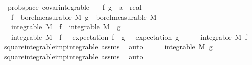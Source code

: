 \begin{isabellebody}
{\isafoldproof}%
%
\isadelimproof
\isanewline
%
\endisadelimproof
\isanewline
{}\isamarkupfalse%
\ {\isacharparenleft}{\kern0pt}\ prob{\isacharunderscore}{\kern0pt}space{\isacharparenright}{\kern0pt}\ covar{\isacharunderscore}{\kern0pt}integrable{\isacharcolon}{\kern0pt}\isanewline
\ \ \ f\ g\ {\isacharcolon}{\kern0pt}{\isacharcolon}{\kern0pt}\ {\isachardoublequoteopen}{\isacharprime}{\kern0pt}a\ {\isasymRightarrow}\ real{\isachardoublequoteclose}\isanewline
\ \ \ {\isachardoublequoteopen}f\ {\isasymin}\ borel{\isacharunderscore}{\kern0pt}measurable\ M{\isachardoublequoteclose}\ {\isachardoublequoteopen}g\ {\isasymin}\ borel{\isacharunderscore}{\kern0pt}measurable\ M{\isachardoublequoteclose}\isanewline
\ \ \ {\isachardoublequoteopen}integrable\ M\ {\isacharparenleft}{\kern0pt}{\isasymlambda}{\isasymomega}{\isachardot}{\kern0pt}\ f\ {\isasymomega}{\isacharcircum}{\kern0pt}{}{\isacharparenright}{\kern0pt}{\isachardoublequoteclose}\ {\isachardoublequoteopen}integrable\ M\ {\isacharparenleft}{\kern0pt}{\isasymlambda}{\isasymomega}{\isachardot}{\kern0pt}\ g\ {\isasymomega}{\isacharcircum}{\kern0pt}{}{\isacharparenright}{\kern0pt}{\isachardoublequoteclose}\isanewline
\ \ \ {\isachardoublequoteopen}integrable\ M\ {\isacharparenleft}{\kern0pt}{\isasymlambda}{\isasymomega}{\isachardot}{\kern0pt}\ {\isacharparenleft}{\kern0pt}f\ {\isasymomega}\ {\isacharminus}{\kern0pt}\ expectation\ f{\isacharparenright}{\kern0pt}\ {\isacharasterisk}{\kern0pt}\ {\isacharparenleft}{\kern0pt}g\ {\isasymomega}\ {\isacharminus}{\kern0pt}\ expectation\ g{\isacharparenright}{\kern0pt}{\isacharparenright}{\kern0pt}{\isachardoublequoteclose}\isanewline
%
\isadelimproof
%
\endisadelimproof
%
\isatagproof
{}\isamarkupfalse%
\ {\isacharminus}{\kern0pt}\isanewline
\ \ \isamarkupfalse%
\ {\isachardoublequoteopen}integrable\ M\ f{\isachardoublequoteclose}\ \isamarkupfalse%
\ square{\isacharunderscore}{\kern0pt}integrable{\isacharunderscore}{\kern0pt}imp{\isacharunderscore}{\kern0pt}integrable\ assms\ \isamarkupfalse%
\ auto\isanewline
\ \ \isamarkupfalse%
\ \isamarkupfalse%
\ {\isachardoublequoteopen}integrable\ M\ g{\isachardoublequoteclose}\ \isamarkupfalse%
\ square{\isacharunderscore}{\kern0pt}integrable{\isacharunderscore}{\kern0pt}imp{\isacharunderscore}{\kern0pt}integrable\ assms\ \isamarkupfalse%
\ auto\isanewline
\ \ \isamarkupfalse%

\end{isabellebody}
